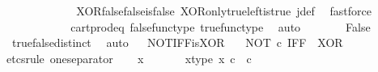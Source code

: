 \begin{isabellebody}
\ {\isachardoublequoteopen}{\isasymlangle}{\isasymf}{\isacharcomma}{\kern0pt}{\isasymt}{\isasymrangle}\ {\isacharequal}{\kern0pt}\ {\isasymlangle}{\isasymf}{\isacharcomma}{\kern0pt}\ {\isasymf}{\isasymrangle}{\isachardoublequoteclose}\isanewline
\ \ \ \ \ \ \isamarkupfalse%
\ XOR{\isacharunderscore}{\kern0pt}false{\isacharunderscore}{\kern0pt}false{\isacharunderscore}{\kern0pt}is{\isacharunderscore}{\kern0pt}false\ XOR{\isacharunderscore}{\kern0pt}only{\isacharunderscore}{\kern0pt}true{\isacharunderscore}{\kern0pt}left{\isacharunderscore}{\kern0pt}is{\isacharunderscore}{\kern0pt}true\ j{\isacharunderscore}{\kern0pt}def\ \isamarkupfalse%
\ fastforce\isanewline
\ \ \ \ \isamarkupfalse%
\ \isamarkupfalse%
\ {\isachardoublequoteopen}{\isasymt}\ {\isacharequal}{\kern0pt}\ {\isasymf}{\isachardoublequoteclose}\isanewline
\ \ \ \ \ \ \isamarkupfalse%
\ cart{\isacharunderscore}{\kern0pt}prod{\isacharunderscore}{\kern0pt}eq{}\ false{\isacharunderscore}{\kern0pt}func{\isacharunderscore}{\kern0pt}type\ true{\isacharunderscore}{\kern0pt}func{\isacharunderscore}{\kern0pt}type\ \isamarkupfalse%
\ auto\isanewline
\ \ \ \ \isamarkupfalse%
\ \isamarkupfalse%
\ False\isanewline
\ \ \ \ \ \ \isamarkupfalse%
\ true{\isacharunderscore}{\kern0pt}false{\isacharunderscore}{\kern0pt}distinct\ \isamarkupfalse%
\ auto\isanewline
\ \isamarkupfalse%
\isanewline
{}\isamarkupfalse%
%
\endisatagproof
{\isafoldproof}%
%
\isadelimproof
\isanewline
%
\endisadelimproof
\isanewline
{}\isamarkupfalse%
\ NOT{\isacharunderscore}{\kern0pt}IFF{\isacharunderscore}{\kern0pt}is{\isacharunderscore}{\kern0pt}XOR{\isacharcolon}{\kern0pt}\ \isanewline
\ \ {\isachardoublequoteopen}NOT\ {\isasymcirc}\isactrlsub c\ IFF\ {\isacharequal}{\kern0pt}\ XOR{\isachardoublequoteclose}\isanewline
%
\isadelimproof
%
\endisadelimproof
%
\isatagproof
{}\isamarkupfalse%
{\isacharparenleft}{\kern0pt}etcs{\isacharunderscore}{\kern0pt}rule\ one{\isacharunderscore}{\kern0pt}separator{\isacharparenright}{\kern0pt}\isanewline
\ \ \isamarkupfalse%
\ x\ \ \ \isanewline
\ \ \isamarkupfalse%
\ x{\isacharunderscore}{\kern0pt}type{\isacharcolon}{\kern0pt}\ {\isachardoublequoteopen}x\ {\isasymin}\isactrlsub c\ {\isasymOmega}\ {\isasymtimes}\isactrlsub c\ {\isasymOmega}{\isachardoublequoteclose}\isanewline
\ \ \isamarkupfalse%
\ \isamarkupfalse%

\end{isabellebody}
